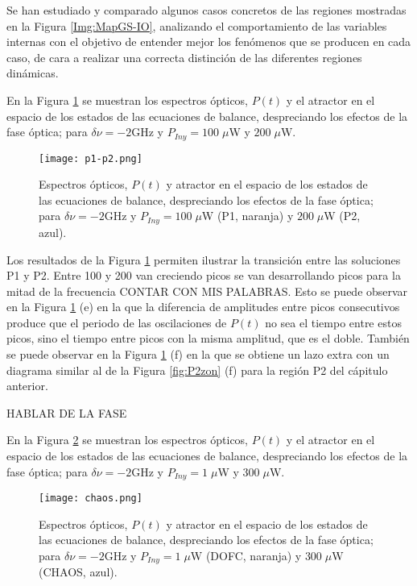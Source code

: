 Se han estudiado y comparado algunos casos concretos de las regiones mostradas en la Figura \ref{Img:MapGS-IO}, analizando el comportamiento de las variables internas con el objetivo de entender mejor los fen\'omenos que se producen en cada caso, de cara a realizar una correcta distinci\'on de las diferentes regiones din\'amicas.

En la Figura \ref{fig:p1-p2} se muestran los espectros \'opticos, $P(t)$ y el atractor en el espacio de los estados de las ecuaciones de balance, despreciando los efectos de la fase \'optica; para $\delta\nu = -2$GHz y $P_{Iny} = 100\;\mu$W y $200\;\mu$W.

	\begin{figure}[H]
		\centering
		\texttt{[image: p1-p2.png]}
		\caption{\label{fig:p1-p2}Espectros \'opticos, $P(t)$ y atractor en el espacio de los estados de las ecuaciones de balance, despreciando los efectos de la fase \'optica; para $\delta\nu = -2$GHz y $P_{Iny} = 100\;\mu$W (P1, naranja) y $200\;\mu$W (P2, azul).}	
	\end{figure}

Los resultados de la Figura \ref{fig:p1-p2} permiten ilustrar la transición entre las soluciones P1 y P2. Entre 100 y 200 van creciendo picos se van desarrollando picos para la mitad de la frecuencia CONTAR CON MIS PALABRAS. Esto se puede observar en la Figura \ref{fig:p1-p2} (e) en la que la diferencia de amplitudes entre picos consecutivos produce que el periodo de las oscilaciones de $P(t)$ no sea el tiempo entre estos picos, sino el tiempo entre picos con la misma amplitud, que es el doble. Tambi\'en se puede observar en la Figura \ref{fig:p1-p2} (f) en la que se obtiene un lazo extra con un diagrama similar al de la Figura \ref{fig:P2zon} (f) para la regi\'on P2 del c\'apitulo anterior.

HABLAR DE LA FASE

En la Figura \ref{fig:chaos} se muestran los espectros \'opticos, $P(t)$ y el atractor en el espacio de los estados de las ecuaciones de balance, despreciando los efectos de la fase \'optica; para $\delta\nu = -2$GHz y $P_{Iny} = 1\;\mu$W y $300\;\mu$W.

	\begin{figure}[H]
		\centering
		\texttt{[image: chaos.png]}
		\caption{\label{fig:chaos}Espectros \'opticos, $P(t)$ y atractor en el espacio de los estados de las ecuaciones de balance, despreciando los efectos de la fase \'optica; para $\delta\nu = -2$GHz y $P_{Iny} = 1\;\mu$W (DOFC, naranja) y $300\;\mu$W (CHAOS, azul).}	
	\end{figure}

